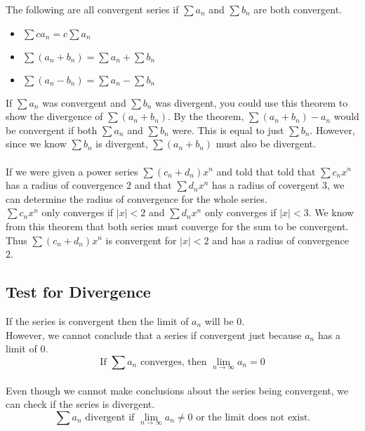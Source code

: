 \documentclass[12pt]{article}
\begin{document}
The following are all convergent series if $\sum a_n$ and $\sum b_n$ are both convergent.

\begin{itemize}
    \item $\sum ca_n = c\sum a_n$
    \item $\sum (a_n + b_n) = \sum a_n + \sum b_n$
    \item $\sum (a_n - b_n) = \sum a_n - \sum b_n$
\end{itemize}
If $\sum a_n$ was convergent and $\sum b_n$ was divergent, you could use this
theorem to show the divergence of $\sum (a_n + b_n)$.
By the theorem, $\sum (a_n + b_n) - a_n$ would be convergent if both
$\sum a_n$ and $\sum b_n$ were. This is equal to just $\sum b_n$.
However, since we know $\sum b_n$ is divergent, $\sum (a_n + b_n)$ must also
be divergent.\\
\\
If we were given a power series $\sum (c_n + d_n)x^n$ and told that told that
$\sum c_nx^n$ has a radius of convergence 2 and that $\sum d_nx^n$ has a
radius of covergent 3, we can determine the radius of convergence for the
whole series.\\
$\sum c_nx^n$ only converges if $|x| < 2$ and $\sum d_nx^n$ only converges if
$|x| < 3$. We know from this theorem that both series must converge for the
sum to be convergent. Thus $\sum (c_n+d_n)x^n$ is convergent for $|x| < 2$ and
has a radius of convergence 2.


\subsection{Test for Divergence}

If the series is convergent then the limit of $a_n$ will be 0.\\
However, we cannot conclude that a series if convergent just because $a_n$ has a limit of 0.\\
\begin{displaymath}
\text{If }\sum a_n\text{ converges, then }\lim_{n\to\infty} a_n = 0
\end{displaymath}
\\
Even though we cannot make conclusions about the series being convergent, we can check if the series is divergent.\\
\begin{displaymath}
\sum a_n\text{ divergent if }\lim_{n\to\infty} a_n \neq 0\text{ or the limit does not exist.}
\end{displaymath}
\end{document}
